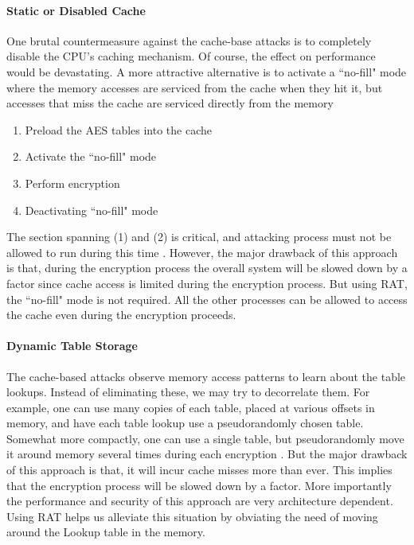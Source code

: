 \paragraph{Static or Disabled Cache}
One brutal countermeasure against the cache-base attacks is to completely disable the CPU's caching mechanism. Of course, the effect on performance would be devastating. A more attractive alternative is to activate a ``no-fill" mode where the memory accesses are serviced from the cache when they hit it, but accesses that miss the cache are serviced directly from the memory

\begin{enumerate}
\item Preload the AES tables into the cache
\item Activate the ``no-fill" mode
\item Perform encryption
\item Deactivating ``no-fill" mode
\end{enumerate}

The section spanning (1) and (2) is critical, and attacking process must not be allowed to run during this time \citep{osvik}. However, the major drawback of this approach is that, during the encryption process the overall system will be slowed down by a factor since cache access is limited during the encryption process. But using RAT, the ``no-fill" mode is not required. All the other processes can be allowed to access the cache even during the encryption proceeds.\\

\paragraph{Dynamic Table Storage}
The cache-based attacks observe memory access patterns to learn about the table lookups. Instead of eliminating these, we may try to decorrelate them. For example, one can use many copies of each table, placed at various offsets in memory, and have each table lookup use a pseudorandomly chosen table. Somewhat more compactly, one can use a single table, but pseudorandomly move it around memory several times during each encryption \citep{osvik}. But the major drawback of this approach is that, it will incur cache misses more than ever. This implies that the encryption process will be slowed down by a factor. More importantly the performance and security of this approach are very architecture dependent. Using RAT helps us alleviate this situation by obviating the need of moving around the Lookup table in the memory.


